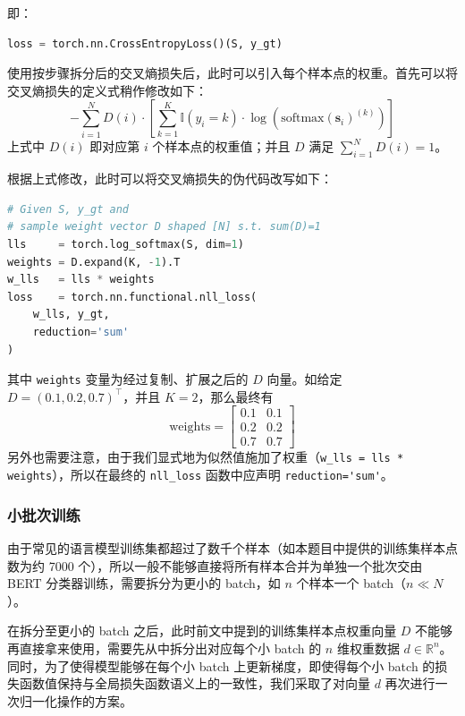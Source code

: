 \documentclass[12pt, a4paper, UTF8]{ctexart}
\begin{document}
即：

\begin{small}
\begin{lstlisting}[language=Python]
loss = torch.nn.CrossEntropyLoss()(S, y_gt)
\end{lstlisting}
\end{small}

使用按步骤拆分后的交叉熵损失后，此时可以引入每个样本点的权重。首先可以将交叉熵损失的定义式稍作修改如下：
$$
- \sum_{i=1}^{N} D(i) \cdot \left[ \sum_{k=1}^{K} \mathbb{I}(y_{i}=k) \cdot \log (\mathrm{softmax}(\boldsymbol{s}_{i})^{(k)}) \right]
$$
上式中 $D(i)$ 即对应第 $i$ 个样本点的权重值；并且 $D$ 满足 $\sum_{i=1}^{N}D(i)=1$。

根据上式修改，此时可以将交叉熵损失的伪代码改写如下：

\begin{small}
\begin{lstlisting}[language=Python]
# Given S, y_gt and
# sample weight vector D shaped [N] s.t. sum(D)=1
lls     = torch.log_softmax(S, dim=1)
weights = D.expand(K, -1).T
w_lls   = lls * weights
loss    = torch.nn.functional.nll_loss(
    w_lls, y_gt,
    reduction='sum'
)
\end{lstlisting}
\end{small}

其中 \verb|weights| 变量为经过复制、扩展之后的 $D$ 向量。如给定 $D=(0.1, 0.2, 0.7)^{\top}$，并且 $K=2$，那么最终有
$$
\mathrm{weights}= \left[\begin{matrix}
0.1 & 0.1 \\
0.2 & 0.2 \\
0.7 & 0.7
\end{matrix}\right]
$$
另外也需要注意，由于我们显式地为似然值施加了权重（\verb|w_lls = lls * weights|），所以在最终的 \verb|nll_loss| 函数中应声明 \verb|reduction='sum'|。

\subsubsection{小批次训练}
\label{sec:adab-bert-minibatch}

由于常见的语言模型训练集都超过了数千个样本（如本题目中提供的训练集样本点数为约 7000 个），所以一般不能够直接将所有样本合并为单独一个批次交由 BERT 分类器训练，需要拆分为更小的 batch，如 $n$ 个样本一个 batch（$n\ll N$）。

在拆分至更小的 batch 之后，此时前文中提到的训练集样本点权重向量 $D$ 不能够再直接拿来使用，需要先从中拆分出对应每个小 batch 的 $n$ 维权重数据 $d \in \mathbb{R}^{n}$。同时，为了使得模型能够在每个小 batch 上更新梯度，即使得每个小 batch 的损失函数值保持与全局损失函数语义上的一致性，我们采取了对向量 $d$ 再次进行一次归一化操作的方案。
\end{document}
